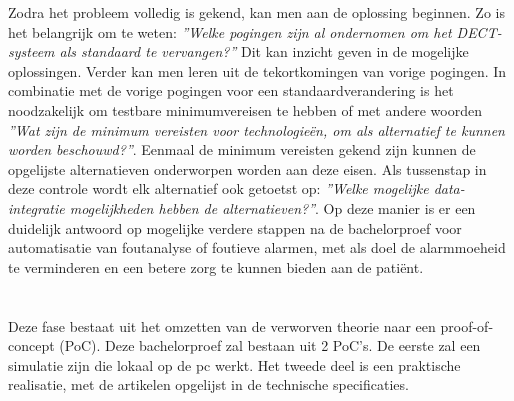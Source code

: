 Zodra het probleem volledig is gekend, kan men aan de oplossing beginnen. Zo is het belangrijk om te weten: \textit{''Welke pogingen zijn al ondernomen om het DECT-systeem als standaard te vervangen?''} Dit kan inzicht geven in de mogelijke oplossingen. Verder kan men leren uit de tekortkomingen van vorige pogingen. In combinatie met de vorige pogingen voor een standaardverandering is het noodzakelijk om testbare minimumvereisen te hebben of met andere woorden \textit{''Wat zijn de minimum vereisten voor technologieën, om als alternatief te kunnen worden beschouwd?''}. 
Eenmaal de minimum vereisten gekend zijn kunnen de opgelijste alternatieven onderworpen worden aan deze eisen. Als tussenstap in deze controle wordt elk alternatief ook getoetst op: \textit{''Welke mogelijke data-integratie mogelijkheden hebben de alternatieven?''}. Op deze manier is er een duidelijk antwoord op mogelijke verdere stappen na de bachelorproef voor automatisatie van foutanalyse of foutieve alarmen, met als doel de alarmmoeheid te verminderen en een betere zorg te kunnen bieden aan de patiënt.



\section{}%
\label{sec:setup}%
Deze fase bestaat uit het omzetten van de verworven theorie naar een proof-of-concept (PoC). Deze bachelorproef zal bestaan uit 2 PoC's. De eerste zal een simulatie zijn die lokaal op de pc werkt. Het tweede deel is een praktische realisatie, met de artikelen opgelijst in de technische specificaties.

